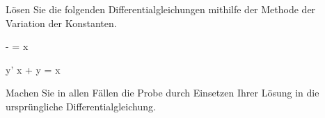\begin{atiTask}[
	title = Die Methode der Variation der Konstanten I
]
	Lösen Sie die folgenden Differentialgleichungen mithilfe der Methode der Variation der Konstanten.
	\begin{atiSubequations}
		\item{
			- = \sin x
		}
		\item{
			y' \tan x + y = \sin x
		}
	\end{atiSubequations}
	Machen Sie in allen Fällen die Probe durch Einsetzen Ihrer Lösung in die ursprüngliche Differentialgleichung.
\end{atiTask}